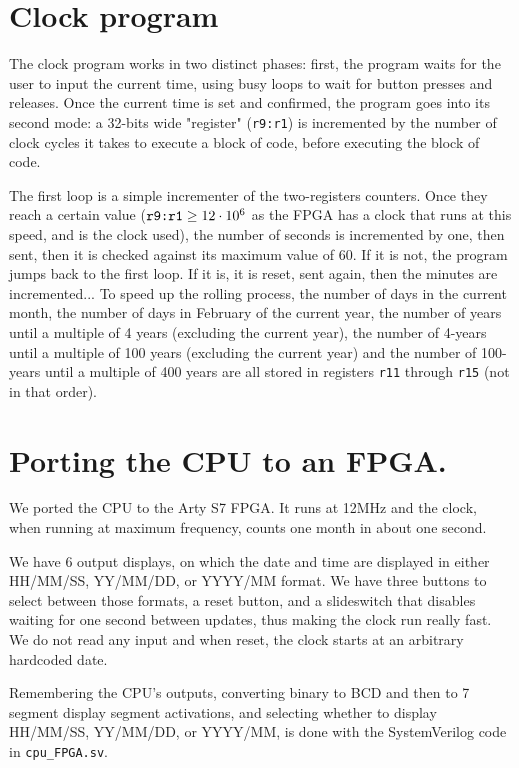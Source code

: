 \documentclass{scrartcl}
\begin{document}
\section*{Clock program}

The clock program works in two distinct phases: first, the program waits for
the user to input the current time, using busy loops to wait for button
presses and releases. Once the current time is set and confirmed, the program
goes into its second mode: a 32-bits wide "register" (\verb+r9:r1+) is
incremented by the number of clock cycles it takes to execute a block of
code, before executing the block of code.\par
The first loop is a simple incrementer of the two-registers counters. Once
they reach a certain value ($\verb+r9:r1+ \geq 12 \cdot 10^6$ as the FPGA has
a clock that runs at this speed, and is the clock used), the number of
seconds is incremented by one, then sent, then it is checked against its
maximum value of $60$. If it is not, the program jumps back to the first
loop. If it is, it is reset, sent again, then the minutes are
incremented...
To speed up the rolling process, the number of days in the current month, the
number of days in February of the current year, the number of years until a
multiple of 4 years (excluding the current year), the number of 4-years until
a multiple of 100 years (excluding the current year) and the number of
100-years until a multiple of 400 years are all stored in registers
\verb+r11+ through \verb+r15+ (not in that order).

\section{Porting the CPU to an FPGA.}

We ported the CPU to the Arty S7 FPGA. It runs at 12MHz and the clock, when running at maximum frequency, counts one month in about one second.

We have 6 output displays, on which the date and time are displayed in either HH/MM/SS, YY/MM/DD, or YYYY/MM format. We have three buttons to select between those formats, a reset button, and a slideswitch that disables waiting for one second between updates, thus making the clock run really fast. We do not read any input and when reset, the clock starts at an arbitrary hardcoded date.

Remembering the CPU's outputs, converting binary to BCD and then to 7 segment display segment activations, and selecting whether to display HH/MM/SS, YY/MM/DD, or YYYY/MM, is done with the SystemVerilog code in \verb|cpu_FPGA.sv|.
\end{document}
